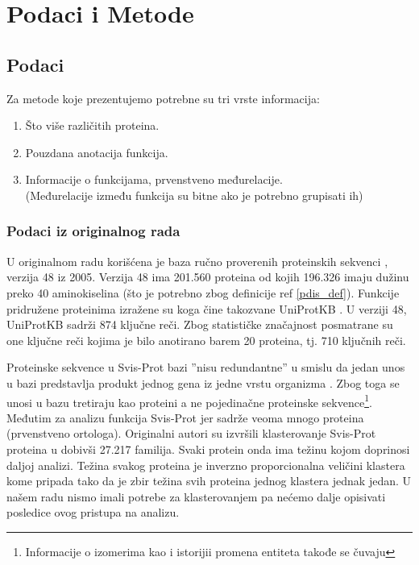 
\chapter{Podaci i Metode} %

\label{Podaci i Metode} %



\section {Podaci}

Za metode koje prezentujemo potrebne su tri vrste informacija:
\begin{enumerate}
  \item Što više različitih proteina.
  \item Pouzdana anotacija funkcija.
  \item Informacije o funkcijama, prvenstveno međurelacije.\\
    (Međurelacije između funkcija su bitne  ako je potrebno grupisati ih)
\end{enumerate}


\subsection{Podaci iz originalnog rada}

U originalnom radu \parencite{Xie2007} korišćena je  baza ručno proverenih
proteinskih sekvenci  , verzija 48 iz 2005.
Verzija 48 ima 201.560 proteina od kojih 196.326 imaju dužinu preko 40
aminokiselina (što je potrebno zbog definicije ref \ref{pdis_def}). Funkcije
pridružene proteinima izražene su 
 koga čine takozvane UniProtKB 
. U verziji 48, UniProtKB sadrži 874 ključne reči.  Zbog
statističke značajnost posmatrane su one ključne reči kojima je bilo anotirano
barem 20 proteina, tj. 710 ključnih reči.

Proteinske sekvence u Svis-Prot bazi ''nisu redundantne'' u smislu da jedan
unos u bazi predstavlja produkt jednog gena iz jedne vrstu organizma
\parencite{nonRedundant}. Zbog toga se unosi u bazu tretiraju kao proteini a ne
pojedinačne proteinske sekvence\footnote{Informacije o izomerima kao i
istorijii promena entiteta takođe se čuvaju}.  Međutim za analizu funkcija
Svis-Prot  jer sadrže veoma mnogo
 proteina (prvenstveno ortologa).  Originalni autori
\parencite{Xie2007} su izvršili klasterovanje Svis-Prot proteina u
 dobivši 27.217 familija. Svaki protein onda ima
težinu kojom doprinosi daljoj analizi. Težina svakog proteina je inverzno
proporcionalna veličini klastera kome pripada tako da je zbir težina svih
proteina jednog klastera jednak jedan.  U našem radu nismo imali potrebe za
klasterovanjem pa nećemo dalje opisivati posledice ovog pristupa na analizu.

